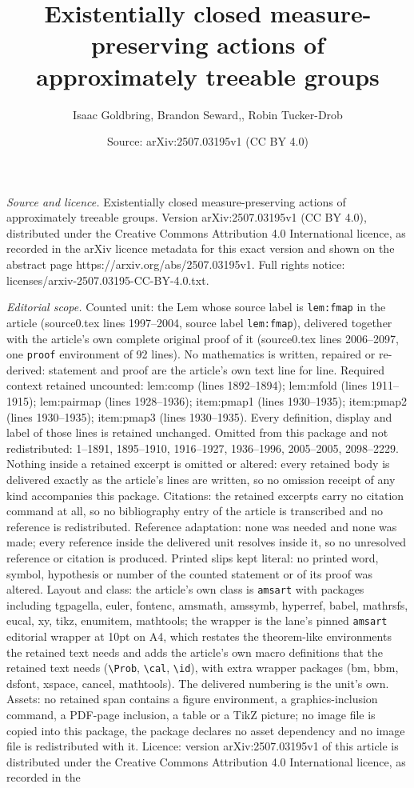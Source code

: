 \documentclass[10pt,a4paper]{amsart}
\title[Existentially closed measure-preserving actions of approxima]{Existentially closed measure-preserving actions of approximately treeable groups}
\author{Isaac Goldbring, Brandon Seward,, Robin Tucker-Drob}
\date{Source: arXiv:2507.03195v1 (CC BY 4.0)}
\begin{document}
\maketitle

\noindent\emph{Source and licence.} Existentially closed measure-preserving actions of approximately treeable groups. Version arXiv:2507.03195v1 (CC BY 4.0), distributed under the Creative Commons Attribution 4.0 International licence, as recorded in the arXiv licence metadata for this exact version and shown on the abstract page https://arxiv.org/abs/2507.03195v1. Full rights notice: licenses/arxiv-2507.03195-CC-BY-4.0.txt.\par\smallskip

\noindent\textit{Editorial scope.} Counted unit: the Lem whose source label is \texttt{lem:fmap} in the article (source0.tex lines 1997--2004, source label \texttt{lem:fmap}), delivered together with the article's own complete original proof of it (source0.tex lines 2006--2097, one \texttt{proof} environment of 92 lines). No mathematics is written, repaired or re-derived: statement and proof are the article's own text line for line. Required context retained uncounted: lem:comp (lines 1892--1894); lem:mfold (lines 1911--1915); lem:pairmap (lines 1928--1936); item:pmap1 (lines 1930--1935); item:pmap2 (lines 1930--1935); item:pmap3 (lines 1930--1935). Every definition, display and label of those lines is retained unchanged. Omitted from this package and not redistributed: 1--1891, 1895--1910, 1916--1927, 1936--1996, 2005--2005, 2098--2229. Nothing inside a retained excerpt is omitted or altered: every retained body is delivered exactly as the article's lines are written, so no omission receipt of any kind accompanies this package. Citations: the retained excerpts carry no citation command at all, so no bibliography entry of the article is transcribed and no reference is redistributed. Reference adaptation: none was needed and none was made; every reference inside the delivered unit resolves inside it, so no unresolved reference or citation is produced. Printed slips kept literal: no printed word, symbol, hypothesis or number of the counted statement or of its proof was altered. Layout and class: the article's own class is \texttt{amsart} with packages including tgpagella, euler, fontenc, amsmath, amssymb, hyperref, babel, mathrsfs, eucal, xy, tikz, enumitem, mathtools; the wrapper is the lane's pinned \texttt{amsart} editorial wrapper at 10pt on A4, which restates the theorem-like environments the retained text needs and adds the article's own macro definitions that the retained text needs (\texttt{\textbackslash Prob}, \texttt{\textbackslash cal}, \texttt{\textbackslash id}), with extra wrapper packages (bm, bbm, dsfont, xspace, cancel, mathtools). The delivered numbering is the unit's own. Assets: no retained span contains a figure environment, a graphics-inclusion command, a PDF-page inclusion, a table or a TikZ picture; no image file is copied into this package, the package declares no asset dependency and no image file is redistributed with it. Licence: version arXiv:2507.03195v1 of this article is distributed under the Creative Commons Attribution 4.0 International licence, as recorded in the 
\end{document}
